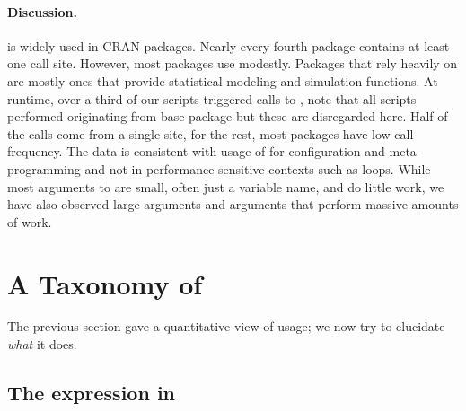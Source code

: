 \documentclass[screen,acmsmall]{acmart}%
\begin{document}
\paragraph{Discussion.}
\Eval is widely used in CRAN packages. Nearly every fourth package contains at
least one \eval call site. However, most packages use \eval modestly. Packages
that rely heavily on \eval are mostly ones that provide statistical modeling and
simulation functions. At runtime, over a third of our scripts triggered calls to
\eval, note that all scripts performed \eval originating from base package but
these are disregarded here. Half of the calls come from a single site, for the
rest, most packages have low call frequency. The data is consistent with usage
of \eval for configuration and meta-programming and not in performance sensitive
contexts such as loops. While most arguments to \eval are small, often just a
variable name, and do little work, we have also observed large \eval arguments
and arguments that perform massive amounts of work.

\section{A Taxonomy of \Eval}

The previous section gave a quantitative view of \eval usage; we now try to
elucidate \emph{what} it does.

\subsection{The expression in \eval} \label{sec:minimized}
\end{document}
